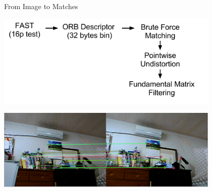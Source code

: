 \documentclass{beamer}
\begin{document}
	\begin{frame}{From Image to Matches}
		\begin{center}
			\includegraphics[width=0.8\textwidth]{./pics/feats.png} 
		\end{center}
		
		\begin{center}
			\includegraphics[width=0.8\textwidth]{./pics/match.png} 
		\end{center}
	\end{frame}
\end{document}
